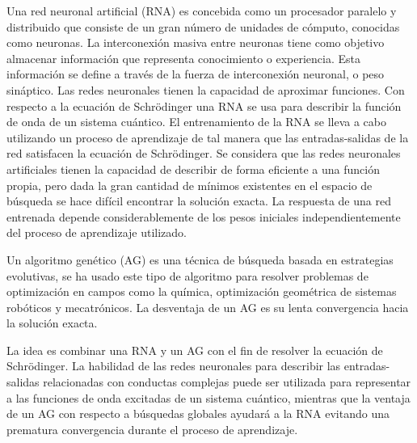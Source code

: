 Una red neuronal artificial (RNA) es concebida como un
procesador paralelo y distribuido que consiste de un gran
n\'umero de unidades de c\'omputo, conocidas como neuronas.
La interconexi\'on masiva entre neuronas tiene como objetivo
almacenar informaci\'on que representa conocimiento
o experiencia. Esta informaci\'on se define a trav\'es de la fuerza de
interconexi\'on neuronal, o peso sin\'aptico. Las redes neuronales
tienen la capacidad de aproximar funciones. Con respecto
a la ecuaci\'on de Schr\"odinger una RNA se usa para describir
la funci\'on de onda de un sistema cu\'antico. El entrenamiento
de la RNA se lleva a cabo utilizando un proceso de aprendizaje
de tal manera que las entradas-salidas de la red satisfacen
la ecuaci\'on de Schr\"odinger. Se considera que las redes neuronales
artificiales tienen la capacidad de describir de forma
eficiente a una funci\'on propia, pero dada la gran cantidad de
m\'inimos existentes en el espacio de b\'usqueda se hace dif\'icil
encontrar la soluci\'on exacta. La respuesta de una red entrenada
depende considerablemente de los pesos iniciales independientemente
del proceso de aprendizaje utilizado.

Un algoritmo gen\'etico (AG) es una t\'ecnica de b\'usqueda
basada en estrategias evolutivas, se ha usado este tipo de
algoritmo para resolver problemas de optimizaci\'on en campos
como la qu\'imica, optimizaci\'on geom\'etrica de sistemas
rob\'oticos y mecatr\'onicos. La desventaja de un AG es su lenta
convergencia hacia la soluci\'on exacta. 

La idea es combinar una RNA y un AG con el fin de resolver
la ecuaci\'on de Schr\"odinger. La habilidad de las redes neuronales
para describir las entradas-salidas relacionadas con
conductas complejas puede ser utilizada para representar a las
funciones de onda excitadas de un sistema cu\'antico, mientras
que la ventaja de un AG con respecto a b\'usquedas globales
ayudar\'a a la RNA evitando una prematura convergencia durante
el proceso de aprendizaje.